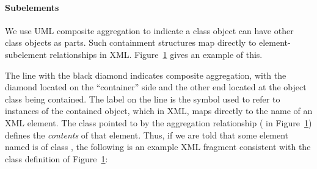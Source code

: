 \begin{blockChanged}
\paragraph{Subelements}

We use UML composite aggregation to indicate a class object can
have other class objects as parts.  Such containment structures
map directly to element-subelement relationships in XML.
Figure~\ref{fig:subelement-eg} gives an example of this.

\begin{figure}[htb]
  \centering
  \small
  \vspace*{-1ex}
  \caption{}
  \label{fig:subelement-eg}
\end{figure}

The line with the black diamond indicates composite aggregation,
with the diamond located on the ``container'' side and the other
end located at the object class being contained.  The label on the
line is the symbol used to refer to instances of the contained
object, which in XML, maps directly to the name of an XML element.
The class pointed to by the aggregation relationship (
in Figure~\ref{fig:subelement-eg}) defines the \emph{contents} of
that element.  Thus, if we are told that some element named
 is of class , the following is an
example XML fragment consistent with the class definition of
Figure~\ref{fig:subelement-eg}:


\end{blockChanged}
